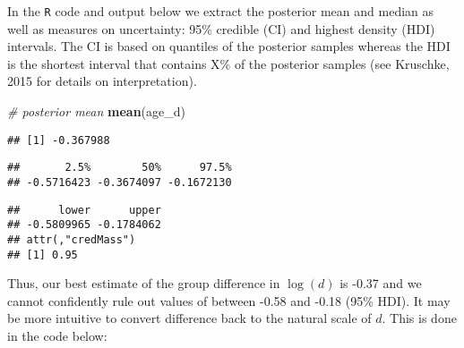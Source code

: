 \documentclass[
  english,
  ,man,floatsintext]{apa6}
\newenvironment{Shaded}{\begin{snugshade}}{\end{snugshade}}
\newcommand{\CommentTok}[1]{\textcolor[rgb]{0.56,0.35,0.01}{\textit{#1}}}
\newcommand{\DataTypeTok}[1]{\textcolor[rgb]{0.13,0.29,0.53}{#1}}
\newcommand{\FloatTok}[1]{\textcolor[rgb]{0.00,0.00,0.81}{#1}}
\newcommand{\KeywordTok}[1]{\textcolor[rgb]{0.13,0.29,0.53}{\textbf{#1}}}
\newcommand{\NormalTok}[1]{#1}
\begin{document}
In the \texttt{R} code and output below we extract the posterior mean and median as well as measures on uncertainty: 95\% credible (CI) and highest density (HDI) intervals. The CI is based on quantiles of the posterior samples whereas the HDI is the shortest interval that contains X\% of the posterior samples (see Kruschke, 2015 for details on interpretation).

\begin{Shaded}
\begin{Highlighting}[]
\CommentTok{# posterior mean}
\KeywordTok{mean}\NormalTok{(age_d)}
\end{Highlighting}
\end{Shaded}

\begin{verbatim}
## [1] -0.367988
\end{verbatim}

\begin{Shaded}
\end{Shaded}

\begin{verbatim}
##       2.5%        50%      97.5% 
## -0.5716423 -0.3674097 -0.1672130
\end{verbatim}

\begin{Shaded}
\end{Shaded}

\begin{verbatim}
##      lower      upper 
## -0.5809965 -0.1784062 
## attr(,"credMass")
## [1] 0.95
\end{verbatim}

Thus, our best estimate of the group difference in \(\log(d)\) is -0.37 and we cannot confidently rule out values of between -0.58 and -0.18 (95\% HDI). It may be more intuitive to convert difference back to the natural scale of \(d\). This is done in the code below:
\end{document}
